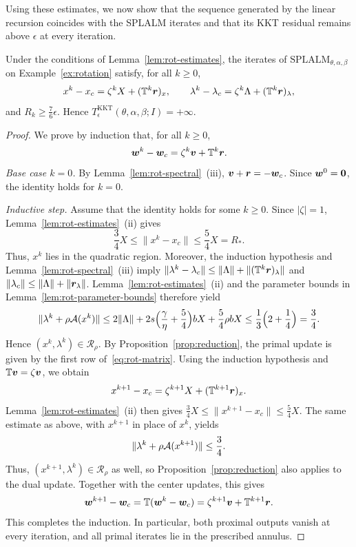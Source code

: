 Using these estimates, we now show that the sequence generated by the linear
recursion coincides with the SPLALM iterates and that its KKT residual
remains above \(\epsilon\) at every iteration.

\begin{lemma}
\label{lem:rot-trajectory}
Under the conditions of Lemma~\ref{lem:rot-estimates}, the iterates of
\(\mathrm{SPLALM}_{\theta,\alpha,\beta}\) on Example~\ref{ex:rotation}
satisfy, for all \(k\ge0\),
\[
x^k-x_c=\zeta^kX+(\mathbb T^k\bm{r})_x,
\qquad
\lambda^k-\lambda_c=\zeta^k\Lambda+(\mathbb T^k\bm{r})_\lambda,
\]
and \(R_k\ge\frac76\epsilon\). Hence
\(T^{\mathrm{KKT}}_\epsilon(\theta,\alpha,\beta;I)=+\infty\).
\end{lemma}

\begin{proof}
We prove by induction that, for all \(k\ge0\),
\[
\bm{w}^k-\bm{w}_c=\zeta^k\bm{v}+\mathbb T^k\bm{r}.
\]
\emph{Base case \(k=0\).} By Lemma~\ref{lem:rot-spectral}~(iii),
\(\bm{v}+\bm{r}=-\bm{w}_c\). Since \(\bm{w}^0=\bm{0}\), the identity holds for \(k=0\).

\emph{Inductive step.} Assume that the identity holds for some \(k\ge0\).
Since \(|\zeta|=1\), Lemma~\ref{lem:rot-estimates}~(ii) gives
\[
\frac34X\le\|x^k-x_c\|\le\frac54X=R_*.
\]
Thus, \(x^k\) lies in the quadratic region. Moreover, the induction
hypothesis and Lemma~\ref{lem:rot-spectral}~(iii) imply
\(\|\lambda^k-\lambda_c\|\le\|\Lambda\|+\|(\mathbb T^k\bm{r})_\lambda\|\)
and \(\|\lambda_c\|\le\|\Lambda\|+\|\bm{r}_\lambda\|\).
Lemma~\ref{lem:rot-estimates}~(ii) and the parameter bounds in
Lemma~\ref{lem:rot-parameter-bounds} therefore yield
\[
\|\lambda^k+\rho\mathcal{A}(x^k)\|
\le2\|\Lambda\|+2s\Bigl(\frac{\gamma}{\eta}+\frac54\Bigr)bX+\frac54\rho bX
\le\frac13\Bigl(2+\frac14\Bigr)=\frac34.
\]
Hence \((x^k,\lambda^k)\in\mathcal R_\rho\). By
Proposition~\ref{prop:reduction}, the primal update is given by the first
row of~\eqref{eq:rot-matrix}. Using the induction hypothesis and
\(\mathbb T\bm{v}=\zeta\bm{v}\), we obtain
\[
x^{k+1}-x_c=\zeta^{k+1}X+(\mathbb T^{k+1}\bm{r})_x.
\]
Lemma~\ref{lem:rot-estimates}~(ii) then gives
\(\frac34X\le\|x^{k+1}-x_c\|\le\frac54X\).
The same estimate as above, with \(x^{k+1}\) in place of \(x^k\), yields
\[
\|\lambda^k+\rho\mathcal{A}(x^{k+1})\|\le\frac34.
\]
Thus, \((x^{k+1},\lambda^k)\in\mathcal R_\rho\) as well, so
Proposition~\ref{prop:reduction} also applies to the dual update.
Together with the center updates, this gives
\[
\bm{w}^{k+1}-\bm{w}_c
=\mathbb T(\bm{w}^k-\bm{w}_c)
=\zeta^{k+1}\bm{v}+\mathbb T^{k+1}\bm{r}.
\]
This completes the induction. In particular, both proximal outputs vanish
at every iteration, and all primal iterates lie in the prescribed annulus.


\end{proof}
